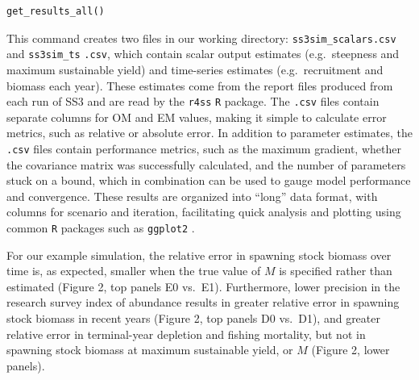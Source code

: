 \documentclass[11pt]{article}
\begin{document}
\begin{verbatim}
get_results_all()
\end{verbatim}

\noindent
This command creates two files in our working directory: \texttt{ss3sim\_scalars.csv} and \texttt{ss3sim\_ts} \texttt{.csv}, which contain scalar output estimates (e.g.~steepness and maximum sustainable yield) and time-series estimates (e.g.~recruitment and biomass each year). These estimates come from the report files produced from each run of SS3 and are read by the \texttt{r4ss} \texttt{R} package. The \texttt{.csv} files contain separate columns for OM and EM values, making it simple to calculate error metrics, such as relative or absolute error. In addition to parameter estimates, the \texttt{.csv} files contain performance metrics, such as the maximum gradient, whether the covariance matrix was successfully calculated, and the number of parameters stuck on a bound, which in combination can be used to gauge model performance and convergence. These results are organized into ``long'' data format, with columns for scenario and iteration, facilitating quick analysis and plotting using common \texttt{R} packages such as \texttt{ggplot2} \cite{wickham2009}.

For our example simulation, the relative error in spawning stock biomass over time is, as expected, smaller when the true value of $M$ is specified rather than estimated (Figure 2, top panels E0 vs.~E1). Furthermore, lower precision in the research survey index of abundance results in greater relative error in spawning stock biomass in recent years (Figure 2, top panels D0 vs.~D1), and greater relative error in terminal-year depletion and fishing mortality, but not in spawning stock biomass at maximum sustainable yield, or $M$ (Figure 2, lower panels).
\end{document}

